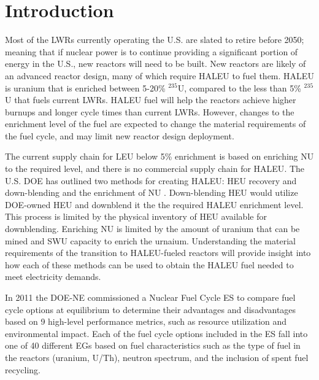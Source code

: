 \section{Introduction}

Most of the \glspl{LWR} currently operating the U.S. are slated to retire
before 2050; meaning that if nuclear power is to continue providing a 
significant portion of energy in the U.S., new reactors will need to be built. 
New reactors are likely of an advanced reactor design, many of 
which require \gls{HALEU} to fuel them. \gls{HALEU} is uranium that 
is enriched between 5-20\% $^{235}$U, compared to the less than 5\% $^{235}$U 
that fuels current \glspl{LWR}. \gls{HALEU} fuel will help 
the reactors achieve higher burnups and longer cycle times than current 
\glspl{LWR}. However, changes to the enrichment level of the fuel are 
expected 
to change the material requirements of the fuel cycle, and may limit 
new reactor design deployment.

The current supply chain for \gls{LEU} below 5\% enrichment is based on 
enriching \gls{NU} to the required level, and there is no commercial 
supply chain for \gls{HALEU}. The U.S. \gls{DOE} has outlined 
two methods for creating \gls{HALEU}: \gls{HEU} recovery and down-blending 
and the enrichment of \gls{NU} \cite{griffith_overview_2020}. 
Down-blending \gls{HEU} would utilize \gls{DOE}-owned \gls{HEU} and 
downblend it the the required \gls{HALEU} enrichment level. This 
process is 
limited by the physical inventory of \gls{HEU} available for downblending. 
Enriching \gls{NU} is limited by the amount of uranium that can be 
mined and \gls{SWU} capacity to enrich the urnaium. Understanding the 
material requirements of the transition to \gls{HALEU}-fueled 
reactors will provide insight into how each of these methods can be used 
to obtain the \gls{HALEU} fuel needed to meet electricity demands.

In 2011 the \gls{DOE-NE} commissioned a Nuclear Fuel Cycle \gls{ES} 
\cite{wigeland_nuclear_2014} to compare fuel cycle options at equilibrium
to determine their advantages and disadvantages
based on 9 high-level performance metrics, such as resource utilization and 
environmental impact. Each of the fuel cycle options included in the 
\gls{ES} fall into one of 40 different \glspl{EG} based on fuel 
characteristics such as the type of fuel in the reactors (uranium, 
U/Th), neutron spectrum, and the inclusion of spent fuel recycling. 


